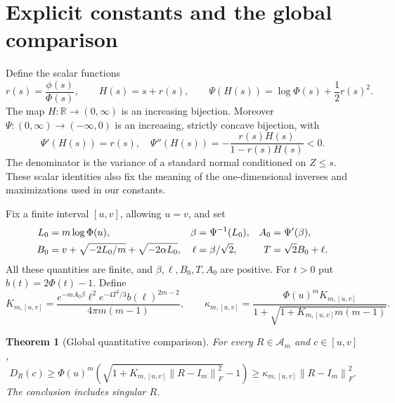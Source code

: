 \documentclass[11pt]{article}
\newtheorem{theorem}{Theorem}
\theoremstyle{remark}\newtheorem{remark}[theorem]{Remark}
\newcommand{\R}{\mathbb R}
\newcommand{\norm}[1]{\left\lVert#1\right\rVert}
\begin{document}
\section{Explicit constants and the global comparison}
Define the scalar functions
\begin{equation}\label{eq:scalar}
 r(s)=\frac{\phi(s)}{\Phi(s)},\qquad H(s)=s+r(s),\qquad
 \Psi(H(s))=\log\Phi(s)+\frac12r(s)^2.
\end{equation}
The map $H:\R\to(0,\infty)$ is an increasing bijection.
Moreover $\Psi:(0,\infty)\to(-\infty,0)$ is an increasing, strictly concave
bijection, with
\begin{equation}\label{eq:psi-derivative}
 \Psi'(H(s))=r(s),\quad
 \Psi''(H(s))=-\frac{r(s)H(s)}{1-r(s)H(s)}<0.
\end{equation}
The denominator is the variance of a standard normal conditioned on $Z\le s$.
These scalar identities also fix the meaning of the one-dimensional inverses
and maximizations used in our constants.

Fix a finite interval $[u,v]$, allowing $u=v$, and set
\begin{align}
 L_0&=m\log\Phi(u),&
 \beta&=\Psi^{-1}(L_0),& A_0&=\Psi'(\beta),\notag\\
 B_0&=v+\sqrt{-2L_0/m}+\sqrt{-2\alpha L_0},&
 \ell&=\beta/\sqrt2,& T&=\sqrt2 B_0+\ell.\label{eq:bounds}
\end{align}
All these quantities are finite, and $\beta,\ell,B_0,T,A_0$ are positive.
For $t>0$ put $b(t)=2\Phi(t)-1$. Define
\begin{equation}\label{eq:K}
 K_{m,[u,v]}=
 \frac{e^{-mA_0\beta}\ell^2e^{-4T^2/3}b(\ell)^{2m-2}}
      {4\pi m(m-1)},\qquad
 \kappa_{m,[u,v]}=
 \frac{\Phi(u)^m K_{m,[u,v]}}
      {1+\sqrt{1+K_{m,[u,v]}m(m-1)}}.
\end{equation}

\begin{theorem}[Global quantitative comparison]\label{thm:global}
For every $R\in\mathcal A_m$ and $c\in[u,v]$,
\begin{equation}\label{eq:global}
 D_R(c)\ge\Phi(u)^m\left(\sqrt{1+K_{m,[u,v]}\norm{R-I_m}_F^2}-1\right)
 \ge\kappa_{m,[u,v]}\norm{R-I_m}_F^2.
\end{equation}
The conclusion includes singular $R$.
\end{theorem}
\end{document}
